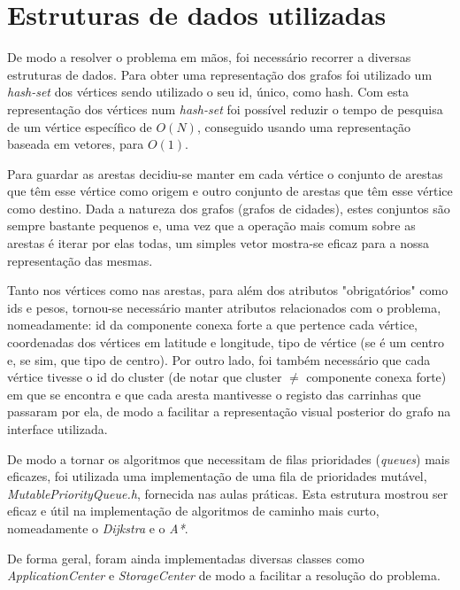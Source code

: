 \documentclass[12pt,a4paper]{report}
\begin{document}
\chapter{Estruturas de dados utilizadas}
De modo a resolver o problema em mãos, foi necessário recorrer a diversas estruturas de dados. Para obter uma representação
dos grafos foi utilizado um \textit{hash-set} dos vértices sendo utilizado o seu id, único, como hash. Com esta representação
dos vértices num \textit{hash-set} foi possível reduzir o tempo de pesquisa de um vértice específico de \( O(N) \), conseguido
usando uma representação baseada em vetores, para \( O(1) \). \par

Para guardar as arestas decidiu-se manter em cada vértice o conjunto de arestas que têm esse vértice como origem e outro
conjunto de arestas que têm esse vértice como destino. Dada a natureza dos grafos (grafos de cidades), estes conjuntos são sempre
bastante pequenos e, uma vez que a operação mais comum sobre as arestas é iterar por elas todas, um simples vetor mostra-se eficaz
para a nossa representação das mesmas. \par

Tanto nos vértices como nas arestas, para além dos atributos "obrigatórios" como ids e pesos, tornou-se necessário manter 
atributos relacionados com o problema, nomeadamente: id da componente conexa forte a que pertence cada vértice, coordenadas dos
vértices em latitude e longitude, tipo de vértice (se é um centro e, se sim, que tipo de centro). Por outro lado, foi também necessário que 
cada vértice tivesse o id do cluster (de notar que cluster \( \neq \) componente conexa forte) em que se encontra e que cada
aresta mantivesse o registo das carrinhas que passaram por ela, de modo a facilitar a representação visual posterior do grafo na interface
utilizada. \par

De modo a tornar os algoritmos que necessitam de filas prioridades (\textit{queues}) mais eficazes, foi utilizada uma implementação
de uma fila de prioridades mutável, \textit{MutablePriorityQueue.h}, fornecida nas aulas práticas. Esta estrutura mostrou
ser eficaz e útil na implementação de algoritmos de caminho mais curto, nomeadamente o \textit{Dijkstra} e o \textit{A*}. \par

De forma geral, foram ainda implementadas diversas classes como \textit{ApplicationCenter} e \textit{StorageCenter} de modo a facilitar
a resolução do problema. \par
\end{document}
